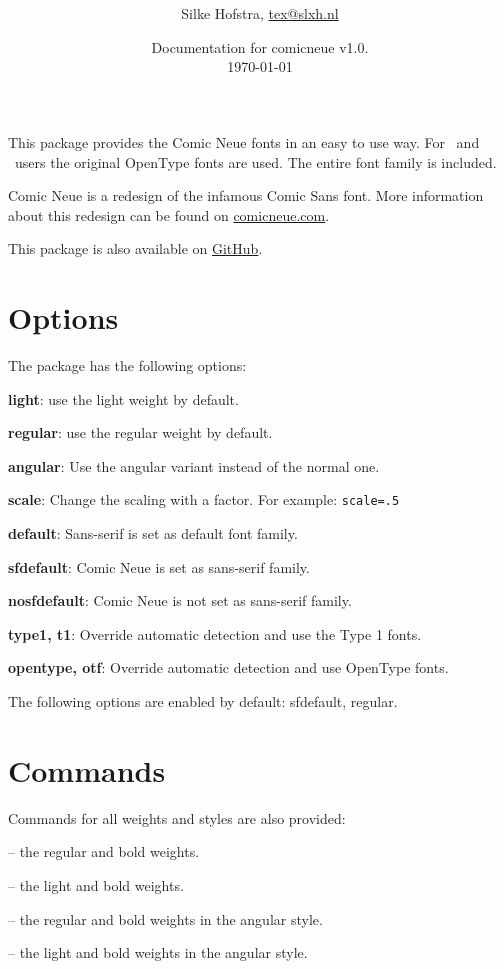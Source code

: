 \documentclass[10pt,a4paper,english]{article}
\title{%
	\vspace{-4em}
	\comicneuelight
	\resizebox{\linewidth}{!}{comicneue}\\
	\resizebox{\linewidth}{!}{Craig Rozynski's Comic Neue fonts for \LaTeX}
}
\author{Silke Hofstra, \href{mailto:tex@slxh.nl}{tex@slxh.nl}}
\date{Documentation for comicneue v1.0.\\ \today}
\begin{document}
\maketitle
\begin{multicols}{2}
This package provides the Comic Neue fonts in an easy to use way.
For \XeLaTeX\ and \LuaLaTeX\ users the original OpenType fonts are used.
The entire font family is included.

Comic Neue is a redesign of the infamous Comic Sans font.
More information about this redesign can be found on \href{http://comicneue.com/}{comicneue.com}.

This package is also available on \href{https://github.com/silkeh/latex-comicneue}{GitHub}.

\section{Options}
The package has the following options:
\begin{itemize*}
	\item \textbf{light}:          use the light weight by default.
	\item \textbf{regular}:        use the regular weight by default.
	\item \textbf{angular}:        Use the angular variant instead of the normal one.
	\item \textbf{scale}:          Change the scaling with a factor. For example:  \texttt{scale=.5}
	\item \textbf{default}:        Sans-serif is set as default font family.
	\item \textbf{sfdefault}:      Comic Neue is set as sans-serif family.
	\item \textbf{nosfdefault}:    Comic Neue is not set as sans-serif family.
	\item \textbf{type1, t1}:      Override automatic detection and use the Type 1 fonts.
	\item \textbf{opentype, otf}:  Override automatic detection and use OpenType fonts.
\end{itemize*}
The following options are enabled by default: sfdefault, regular.

\section{Commands}
Commands for all weights and styles are also provided:
\begin{itemize*}
	\item {}
		-- the regular and bold weights.
	\item {}
		-- the light and bold weights.
	\item {}
		-- the regular and bold weights in the angular style.
	\item {}
		-- the light and bold weights in the angular style.
\end{itemize*}


\end{multicols}
\end{document}
